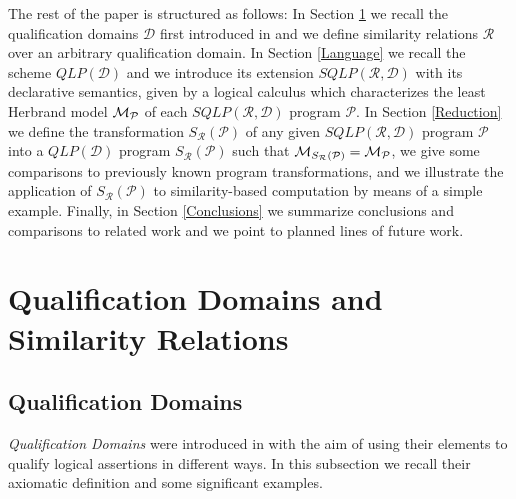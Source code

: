 \documentclass{sigplanconf}
\newcommand{\qdom}{\mathcal{D}} \newcommand{\dqdom}{D \setminus \{\bot\}} \newcommand{\bqdom}{(D \setminus \{\bot\}) \uplus \{?\}}
\newcommand{\simrel}{\mathcal{R}}
\newcommand{\qlp}[1]{QLP({#1})} \newcommand{\slp}[2]{SLP({#1,#2})} \newcommand{\sqlp}[2]{SQLP({#1,#2})} \newcommand{\bqlp}[1]{BQLP({#1})} \newcommand{\clp}[1]{CLP({#1})}
\newcommand{\trans}[2]{S_{#1}(#2)}
\newcommand{\Prog}{\mathcal{P}} \newcommand{\UProg}{\mathcal{P_U}}
\theoremstyle{definition}
\theoremstyle{plain}
\begin{document}
The rest of the paper is structured as follows: In Section \ref{Domains} we recall the qualification domains $\qdom$  first introduced in \cite{RR08} and we define similarity relations $\simrel$ over an arbitrary qualification domain. In Section \ref{Language} we recall the scheme $\qlp{\qdom}$ and we introduce its extension $\sqlp{\simrel}{\qdom}$ with its declarative semantics, given by a logical calculus which characterizes the least
Herbrand model $\M{\Prog}$ of each $\sqlp{\simrel}{\qdom}$ program $\Prog$. In Section \ref{Reduction} we define the transformation $\trans{\simrel}{\Prog}$ of any given $\sqlp{\simrel}{\qdom}$ program $\Prog$ into a $\qlp{\qdom}$ program $\trans{\simrel}{\Prog}$ such that $\M{\trans{\simrel}{\Prog}} = \M{\Prog}$, we give some comparisons to previously known program transformations, and we illustrate the application of
$\trans{\simrel}{\Prog}$ to similarity-based computation by means of a simple example. Finally, in Section \ref{Conclusions} we summarize conclusions and comparisons to related work and we point to planned lines of future work.

\section{Qualification Domains and Similarity Relations} \label{Domains}

\subsection{Qualification Domains} \label{QD}
{\em Qualification Domains}  were introduced in \cite{RR08} with the aim of using their elements to qualify logical assertions in different ways. In this subsection we recall their axiomatic definition and some significant examples.
\end{document}
